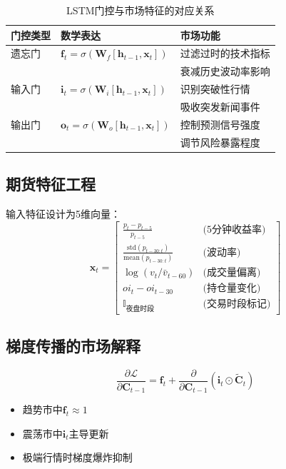 \documentclass[a4paper,11pt]{ctexart}
\begin{document}
\begin{table}[h]
\centering
\caption{LSTM门控与市场特征的对应关系}
\begin{tabular}{lll}
\toprule
门控类型 & 数学表达 & 市场功能 \\
\midrule
遗忘门 & $\mathbf{f}_t=\sigma(\mathbf{W}_f[\mathbf{h}_{t-1},\mathbf{x}_t])$ & 过滤过时的技术指标 \\
 & & 衰减历史波动率影响 \\
输入门 & $\mathbf{i}_t=\sigma(\mathbf{W}_i[\mathbf{h}_{t-1},\mathbf{x}_t])$ & 识别突破性行情 \\
 & & 吸收突发新闻事件 \\
输出门 & $\mathbf{o}_t=\sigma(\mathbf{W}_o[\mathbf{h}_{t-1},\mathbf{x}_t])$ & 控制预测信号强度 \\
 & & 调节风险暴露程度 \\
\bottomrule
\end{tabular}
\end{table}

\subsection*{期货特征工程}
输入特征设计为5维向量：
\begin{equation*}
\mathbf{x}_t = \begin{bmatrix}
\frac{p_t - p_{t-5}}{p_{t-5}} & \text{(5分钟收益率)} \\
\frac{\text{std}(p_{t-30:t})}{\text{mean}(p_{t-30:t})} & \text{(波动率)} \\
\log(v_t/\bar{v}_{t-60}) & \text{(成交量偏离)} \\
oi_t - oi_{t-30} & \text{(持仓量变化)} \\
\mathbb{I}_{\text{夜盘时段}} & \text{(交易时段标记)}
\end{bmatrix}
\end{equation*}

\subsection*{梯度传播的市场解释}
\begin{minipage}[t]{0.6\linewidth}
\begin{equation*}
\frac{\partial \mathcal{L}}{\partial \mathbf{C}_{t-1}} = \mathbf{f}_t + \frac{\partial}{\partial \mathbf{C}_{t-1}}(\mathbf{i}_t \odot \tilde{\mathbf{C}}_t)
\end{equation*}
\end{minipage}
\begin{minipage}[t]{0.35\linewidth}
\begin{itemize}
\item 趋势市中$\mathbf{f}_t \approx 1$
\item 震荡市中$\mathbf{i}_t$主导更新
\item 极端行情时梯度爆炸抑制
\end{itemize}
\end{minipage}
\end{document}
